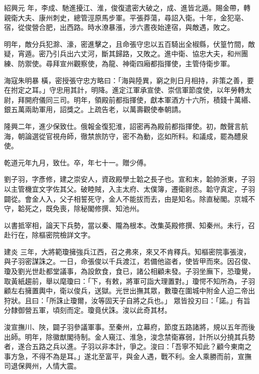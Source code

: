 \begin{pinyinscope}
 紹興元
 年，李成、馳進擾江、淮，俊復遣密大破之，成、進皆北遁。賜金帶，轉親衛大夫、康州刺史，總管涇原馬步軍。平張莽蕩，尋詔入衛。十年，金犯亳、宿，從俊營合肥，出西路。時水潦暴漲，涉六晝夜始達宿，與敵遇，敗之。



 明年，敵分兵犯滁、濠，密進擊之，且命張守忠以五百騎出全椒縣，伏篁竹間，敵疑，宵遁。密乃引兵出六丈河，斷其歸路，又敗之。進中衛、協忠大夫，和州團練、防禦使。尋拜宣州觀察使，為龍、神衛四廂都指揮使，主管侍衛步軍。



 海寇朱明暴
 橫，密授張守忠方略曰：「海與陸異，窮之則日月相持，非策之善，要在拊定之耳。」守忠用其計，明降。進定江軍承宣使、崇信軍節度使，以年勞轉太尉，拜開府儀同三司。明年，領殿前都指揮使，獻本軍酒方十六所，積錢十萬緡、銀五萬兩助軍用，詔獎之。上疏告老，以萬壽觀使奉朝請。



 隆興二年，進少保致仕。俄報金復犯淮，詔密再為殿前都指揮使。初，敵聲言航海，朝論選從官視舟師，徹禁旅防守，密不為動，迄如所料。和議成，罷為醴泉使。



 乾道元年九月，致仕。卒，年七十一。贈少傅。



 劉子羽，字彥修，建之崇安人，資政殿學士韐之長子也。宣和末，韐帥浙東，子羽以主管機宜文字佐其父。破睦賊，入主太府、太僕簿，遷衛尉丞。韐守真定，子羽闢從。會金人入，父子相誓死守，金人不能拔而去，由是知名。除直秘閣。京城不守，韐死之，既免喪，除秘閣修撰、知池州。



 以書抵宰相，論天下兵勢，當以秦、隴為根本。改集英殿修撰、知秦州。未行，召赴行在，除樞密院檢詳文字。



 建炎
 三年，大將範瓊擁強兵江西，召之弗來，來又不肯釋兵。知樞密院事張浚，與子羽密謀誅之。一日，命張俊以千兵渡江，若備他盜者，使皆甲而來。因召俊、瓊及劉光世赴都堂議事，為設飲食，食已，諸公相顧未發。子羽坐廡下，恐瓊覺，取黃紙趨前，舉以麾瓊曰：「下，有敕，將軍可詣大理置對。」瓊愕不知所為，子羽顧左右擁置輿中，衛以俊兵，送獄。光世出撫其眾，數瓊在圍城中附金人迫二帝出狩狀。且曰：「所誅止瓊爾，汝等固天子自將之兵也。」
 眾皆投刃曰：「諾。」有旨分隸御營五軍，頃刻而定。瓊竟伏誅。浚以此奇其材。



 浚宣撫川、陜，闢子羽參議軍事。至秦州，立幕府，節度五路諸將，規以五年而後出師。明年，除徽猷閣待制。金人窺江、淮急，浚念禁衛寡弱，計所以分撓其兵勢者，遂合五路之兵以進。子羽以非本計，爭之。浚曰：「吾寧不知此？顧今東南之事方急，不得不為是耳。」遂北至富平，與金人遇，戰不利。金人乘勝而前，宣撫司退保興州，人情大震。




\end{pinyinscope}
